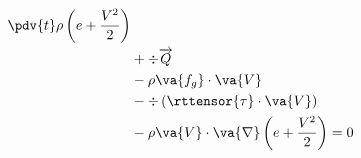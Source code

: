 \begin{equation}
  \begin{split}
\pdv{t}\rho\left
(e + \frac{V^2}{2}\right) \\
    & + \div{\overrightarrow{Q}} \\
    & -\rho\va{f_g}\cdot\va{V} \\
    & - \div\left(\rttensor{\tau}\cdot\va{V}\right) \\
    & - \rho\va{V}\cdot\va{\nabla}\left(e + \frac{V^2}{2}\right) = 0
  \end{split}
\end{equation}

